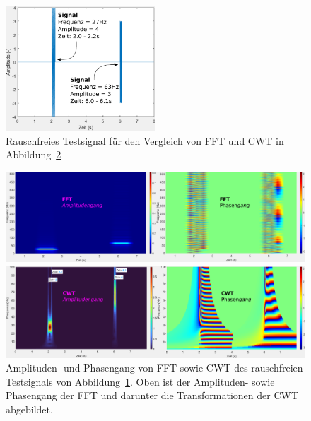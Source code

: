 \begin{figure}
	\centering
	\includegraphics[width=0.5\textwidth]{papers/wavelets/images/18-1_CWTvsFFTSignal.png}
	\caption{Rauschfreies Testsignal für den Vergleich von FFT und CWT
	in Abbildung~\ref{wavelet:fig:FFTnoiseFree}
	\label{wavelet:fig:FFTnoiseFree:beispiel}}
\end{figure}
\begin{figure}
	\centering
	\includegraphics[width=\textwidth]{papers/wavelets/images/18-2_FFTnoiseFree.png}

	\vspace*{0.4cm}
	\includegraphics[width=\textwidth]{papers/wavelets/images/18-3_CWTnoiseFree.png}
	\caption{Amplituden- und Phasengang von FFT sowie CWT 
	des rauschfreien Testsignals von
	Abbildung~\ref{wavelet:fig:FFTnoiseFree:beispiel}.
	Oben ist der Amplituden- sowie Phasengang der
	FFT und darunter die Transformationen der CWT abgebildet.
	\label{wavelet:fig:FFTnoiseFree}}
\end{figure}

	
